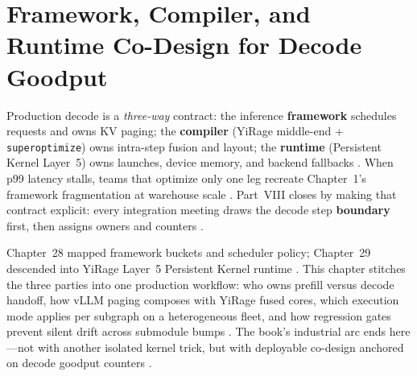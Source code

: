 \chapter{Framework, Compiler, and Runtime Co-Design for Decode Goodput}
\label{chap:ch30}

Production decode is a \emph{three-way} contract: the inference \textbf{framework} schedules requests and owns KV paging; the \textbf{compiler} (YiRage middle-end + \texttt{superoptimize}) owns intra-step fusion and layout; the \textbf{runtime} (Persistent Kernel Layer~5) owns launches, device memory, and backend fallbacks \citep{yirage2026,kwon2023vllm,patel2025llminference,taxbreak2026,memoryfloor2026,chen2020compilerbasedhardw,liu2024deepseekv3,nvidia2024cudagraphs,dao2022flashattention,dlbook,semianalysis2024tma,amd2024xdna,amd2024aie,dao2023flashdecoding,nvidia2022hopper}. When p99 latency stalls, teams that optimize only one leg recreate Chapter~1's framework fragmentation at warehouse scale \citep{patel2025llminference,taxbreak2026,memoryfloor2026,yirage2026,chen2020compilerbasedhardw,dlbook}. Part~VIII closes by making that contract explicit: every integration meeting draws the decode step \textbf{boundary} first, then assigns owners and counters \citep{kwon2023vllm,yirage2026,chen2020compilerbasedhardw,patel2025llminference,taxbreak2026,memoryfloor2026,dlbook}.

Chapter~28 mapped framework buckets and scheduler policy; Chapter~29 descended into YiRage Layer~5 Persistent Kernel runtime \citep{yirage2026,chen2020compilerbasedhardw,patel2025llminference,kwon2023vllm,taxbreak2026,memoryfloor2026,nvidia2024cudagraphs,dlbook}. This chapter stitches the three parties into one production workflow: who owns prefill versus decode handoff, how vLLM paging composes with YiRage fused cores, which execution mode applies per subgraph on a heterogeneous fleet, and how regression gates prevent silent drift across submodule bumps \citep{kwon2023vllm,yirage2026,chen2020compilerbasedhardw,patel2025llminference,liu2024deepseekv3,nvidia2024cudagraphs,dao2022flashattention,semianalysis2024tma,dlbook}. The book's industrial arc ends here---not with another isolated kernel trick, but with deployable co-design anchored on decode goodput counters \citep{taxbreak2026,memoryfloor2026,patel2025llminference,yirage2026,chen2020compilerbasedhardw,dlbook}.

